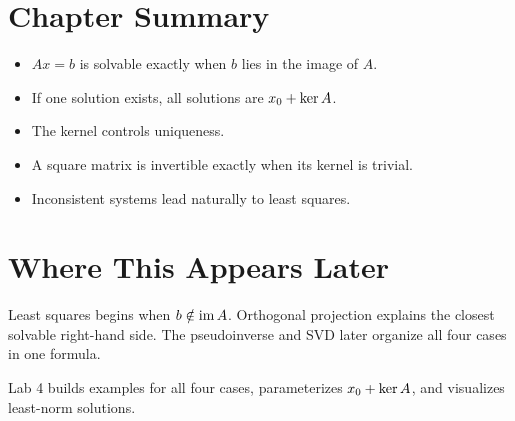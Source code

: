 \section*{Chapter Summary}

\begin{itemize}
  \item $Ax=b$ is solvable exactly when $b$ lies in the image of $A$.
  \item If one solution exists, all solutions are $x_0+\operatorname{ker} A$.
  \item The kernel controls uniqueness.
  \item A square matrix is invertible exactly when its kernel is trivial.
  \item Inconsistent systems lead naturally to least squares.
\end{itemize}

\section*{Where This Appears Later}

Least squares begins when $b\notin\operatorname{im} A$. Orthogonal projection explains the
closest solvable right-hand side. The pseudoinverse and SVD later organize all
four cases in one formula.

\begin{labbox}
Lab 4 builds examples for all four cases, parameterizes $x_0+\operatorname{ker} A$, and
visualizes least-norm solutions.
\end{labbox}



